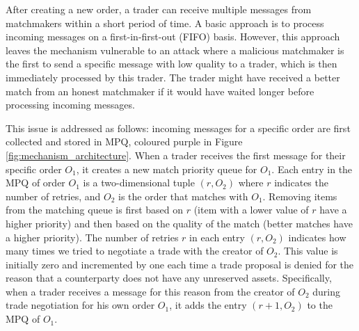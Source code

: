 After creating a new order, a trader can receive multiple \MsgMatch{} messages from matchmakers within a short period of time.
A basic approach is to process incoming \MsgMatch{} messages on a first-in-first-out (FIFO) basis.
However, this approach leaves the mechanism vulnerable to an attack where a malicious matchmaker is the first to send a specific \MsgMatch{} message with low quality to a trader, which is then immediately processed by this trader.
The trader might have received a better match from an honest matchmaker if it would have waited longer before processing incoming \MsgMatch{} messages.

This issue is addressed as follows: incoming \MsgMatch{} messages for a specific order are first collected and stored in MPQ, coloured purple in Figure \ref{fig:mechanism_architecture}.
When a trader receives the first \MsgMatch{} message for their specific order $ O_1 $, it creates a new match priority queue for $ O_1 $.
Each entry in the MPQ of order $ O_1 $ is a two-dimensional tuple $ (r, O_2) $ where $ r $ indicates the number of retries, and $ O_2 $ is the order that matches with $ O_1 $.
Removing items from the matching queue is first based on $ r $ (item with a lower value of $ r $ have a higher priority) and then based on the quality of the match (better matches have a higher priority).
The number of retries $ r $ in each entry $ (r, O_2) $ indicates how many times we tried to negotiate a trade with the creator of $ O_2 $.
This value is initially zero and incremented by one each time a trade proposal is denied for the reason that a counterparty does not have any unreserved assets.
Specifically, when a trader receives a \MsgTrdReject{} message for this reason from the creator of $ O_2 $ during trade negotiation for his own order $ O_1 $, it adds the entry $ (r + 1, O_2) $ to the MPQ of $ O_1 $.

